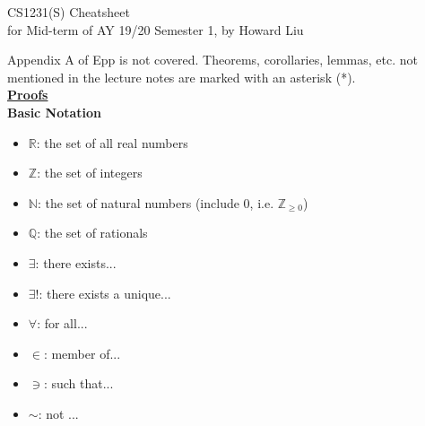 \documentclass[a4paper]{article}
\newcommand{\heading}[1]{{\small\underline{\textbf{#1}}}}
\newcommand{\subheading}[1]{{\scriptsize\textbf{#1}}}
\begin{document}
\scriptsize                         %
\setlength\parindent{0pt}           %
\setlength{\abovedisplayskip}{3pt}  %
\setlength{\belowdisplayskip}{3pt}  %

\begin{center}
{\large CS1231(S) Cheatsheet}\\{for Mid-term of AY 19/20 Semester 1, by Howard Liu}
\end{center}

\begin{multicols*}{4}

Appendix A of Epp is not covered. Theorems, corollaries, lemmas, etc. not
mentioned in the lecture notes are marked with an asterisk (*).\\

\heading{Proofs} \\

\subheading{Basic Notation}
\begin{itemize}[leftmargin=*] \itemsep -0.5em
    \item $\mathbb{R}$: the set of all real numbers
    \item $\mathbb{Z}$: the set of integers
    \item $\mathbb{N}$: the set of natural numbers (include $0$, i.e. $\mathbb{Z}_{\ge 0}$)
    \item $\mathbb{Q}$: the set of rationals
    \item $\exists$:    there exists...
    \item $\exists!$:   there exists a unique...
    \item $\forall$:    for all...
    \item $\in$:        member of...
    \item $\ni$:        such that...
    \item $\sim$:       not ...
\end{itemize}


\end{multicols*}
\end{document}
